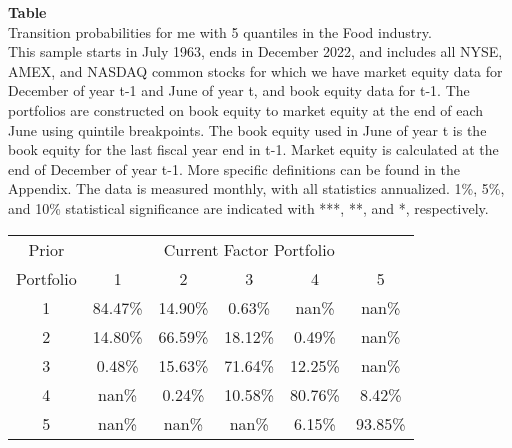 \begin{table*}[ht!]
\raggedright
{}
\label{tab: transition_probs_me_Food_with_5_quantiles}
\textbf{Table \thetable} \\
Transition probabilities for me with 5 quantiles in the Food industry. \\
\hspace*{1em}This sample starts in July 1963, ends in December 2022, and includes all NYSE, AMEX, and NASDAQ common stocks for which we have market equity data for December of year t-1 and June of year t, and book equity data for t-1. The portfolios are constructed on book equity to market equity at the end of each June using quintile breakpoints.  The book equity used in June of year t is the book equity for the last fiscal year end in t-1.  Market equity is calculated at the end of December of year t-1.  More specific definitions can be found in the Appendix.  The data is measured monthly, with all statistics annualized.  1\%, 5\%, and 10\% statistical significance are indicated with ***, **, and *, respectively. \\
\vspace{0.5em}
\centering
\begin{adjustbox}{max width=\textwidth}
\begin{tabular}{@{}cccccc@{}}
\toprule
Prior & \multicolumn{5}{c}{Current Factor Portfolio} \\
Portfolio & 1 & 2 & 3 & 4 & 5 \\
\midrule
1 & 84.47\% & 14.90\% & 0.63\% & nan\% & nan\% \\
2 & 14.80\% & 66.59\% & 18.12\% & 0.49\% & nan\% \\
3 & 0.48\% & 15.63\% & 71.64\% & 12.25\% & nan\% \\
4 & nan\% & 0.24\% & 10.58\% & 80.76\% & 8.42\% \\
5 & nan\% & nan\% & nan\% & 6.15\% & 93.85\% \\
\bottomrule
\end{tabular}
\end{adjustbox}
\end{table*}